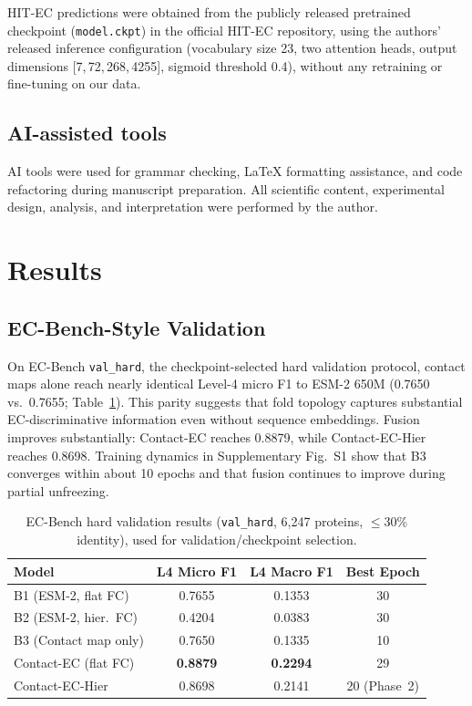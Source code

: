 \documentclass[numbered,contemporary,mediumone]{oup-authoring-template}
\begin{document}
HIT-EC predictions were obtained from the publicly released pretrained
checkpoint (\texttt{model.ckpt}) in the official HIT-EC repository, using the
authors' released inference configuration (vocabulary size 23, two attention
heads, output dimensions [7,\,72,\,268,\,4255], sigmoid threshold 0.4),
without any retraining or fine-tuning on our data.

\subsection{AI-assisted tools}

AI tools were used for grammar checking, LaTeX formatting assistance, and code
refactoring during manuscript preparation. All scientific content, experimental
design, analysis, and interpretation were performed by the author.

\section{Results}

\subsection{EC-Bench-Style Validation}

On EC-Bench \texttt{val\_hard}, the checkpoint-selected hard validation protocol,
contact maps alone reach nearly identical Level-4
micro F1 to ESM-2 650M (0.7650 vs.\ 0.7655; Table~\ref{tab:ecbench}). This parity
suggests that fold topology captures substantial EC-discriminative information
even without sequence embeddings. Fusion improves substantially: Contact-EC reaches
0.8879, while Contact-EC-Hier reaches 0.8698. Training dynamics in Supplementary
Fig.~S1 show that B3 converges within about 10 epochs and that fusion continues to
improve during partial unfreezing.

\begin{table}[!htbp]
\centering
\caption{EC-Bench hard validation results (\texttt{val\_hard}, 6{,}247 proteins,
$\leq$30\% identity), used for validation/checkpoint selection.}
\label{tab:ecbench}
\setlength{\tabcolsep}{5pt}
\begin{tabular}{lccc}
\toprule
Model & L4 Micro F1 & L4 Macro F1 & Best Epoch \\
\midrule
B1 (ESM-2, flat FC)       & 0.7655 & 0.1353 & 30 \\
B2 (ESM-2, hier.\ FC)     & 0.4204 & 0.0383 & 30 \\
B3 (Contact map only)     & 0.7650 & 0.1335 & 10 \\
Contact-EC (flat FC)      & \textbf{0.8879} & \textbf{0.2294} & 29 \\
Contact-EC-Hier           & 0.8698 & 0.2141 & 20 (Phase~2) \\
\bottomrule
\end{tabular}
\end{table}
\end{document}
